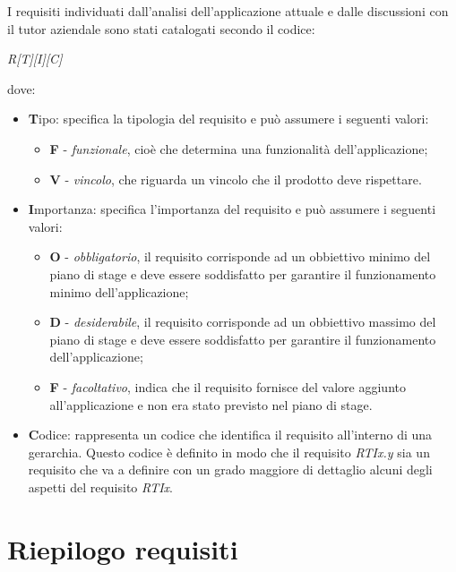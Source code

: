 I requisiti individuati dall'analisi dell'applicazione attuale e dalle discussioni con il tutor aziendale sono stati catalogati secondo il codice:
\begin{center}
\textit{R[T][I][C]}
\end{center}
dove:
\begin{itemize}
\item \textbf{T}ipo: specifica la tipologia del requisito e può assumere i seguenti valori:
	\begin{itemize}
	\item \textbf{F} - \textit{funzionale}, cioè che determina una funzionalità dell'applicazione;
	\item \textbf{V} - \textit{vincolo}, che riguarda un vincolo che il prodotto deve rispettare.
	\end{itemize}
\item \textbf{I}mportanza: specifica l'importanza del requisito e può assumere i seguenti valori:
	\begin{itemize}
	\item \textbf{O} - \textit{obbligatorio}, il requisito corrisponde ad un obbiettivo minimo del piano di stage e deve essere soddisfatto per garantire il funzionamento minimo dell'applicazione;
	\item \textbf{D} - \textit{desiderabile}, il requisito corrisponde ad un obbiettivo massimo del piano di stage e deve essere soddisfatto per garantire il funzionamento dell'applicazione;
	\item \textbf{F} - \textit{facoltativo}, indica che il requisito fornisce del valore aggiunto all'applicazione e non era stato previsto nel piano di stage.
	\end{itemize}
\item \textbf{C}odice: rappresenta un codice che identifica il requisito all'interno di una gerarchia. Questo codice è definito in modo che il requisito \textit{RTIx.y} sia un requisito che va a definire con un grado maggiore di dettaglio alcuni degli aspetti del requisito \textit{RTIx}.
\end{itemize}




\section{Riepilogo requisiti}

